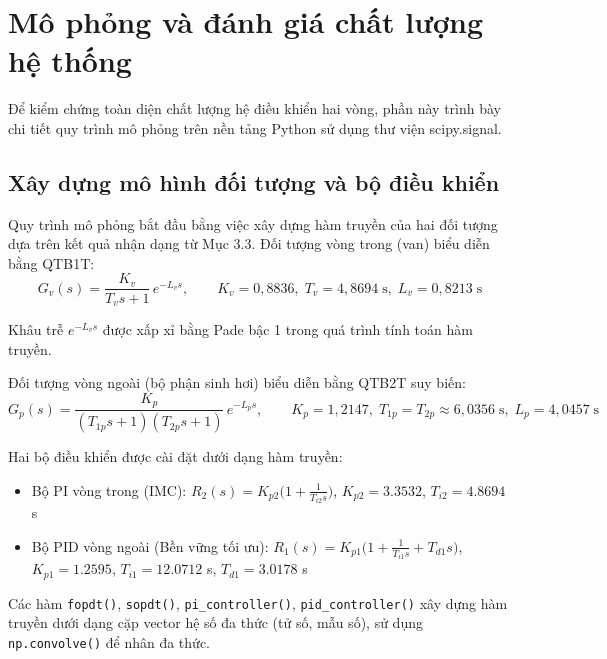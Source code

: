 \documentclass[../main.tex]{subfiles}
\begin{document}
\section{Mô phỏng và đánh giá chất lượng hệ thống}

Để kiểm chứng toàn diện chất lượng hệ điều khiển hai vòng, phần này trình bày chi tiết quy trình mô phỏng trên nền tảng Python sử dụng thư viện scipy.signal.

\subsection{Xây dựng mô hình đối tượng và bộ điều khiển}

Quy trình mô phỏng bắt đầu bằng việc xây dựng hàm truyền của hai đối tượng dựa trên kết quả nhận dạng từ Mục 3.3. Đối tượng vòng trong (van) biểu diễn bằng QTB1T:
\begin{equation}
    G_v(s) = \frac{K_v}{T_v s + 1}\, e^{-L_v s},
    \qquad K_v = 0{,}8836,\; T_v = 4{,}8694\;\text{s},\; L_v = 0{,}8213\;\text{s}
    \label{eq:valve_transfer}
\end{equation}

Khâu trễ $e^{-L_v s}$ được xấp xỉ bằng Pade bậc 1 trong quá trình tính toán hàm truyền.

Đối tượng vòng ngoài (bộ phận sinh hơi) biểu diễn bằng QTB2T suy biến:
\begin{equation}
    G_p(s) = \frac{K_p}{(T_{1p} s + 1)(T_{2p} s + 1)}\, e^{-L_p s},
    \qquad K_p = 1{,}2147,\; T_{1p} = T_{2p} \approx 6{,}0356\;\text{s},\; L_p = 4{,}0457\;\text{s}
    \label{eq:boiler_transfer}
\end{equation}

Hai bộ điều khiển được cài đặt dưới dạng hàm truyền:

\begin{itemize}
    \item Bộ PI vòng trong (IMC): $R_2(s) = K_{p2}\bigl(1 + \frac{1}{T_{i2}s}\bigr)$, $K_{p2} = 3.3532$, $T_{i2} = 4.8694$ s
    \item Bộ PID vòng ngoài (Bền vững tối ưu): $R_1(s) = K_{p1}\bigl(1 + \frac{1}{T_{i1}s} + T_{d1}s\bigr)$, $K_{p1} = 1.2595$, $T_{i1} = 12.0712$ s, $T_{d1} = 3.0178$ s
\end{itemize}

Các hàm {\footnotesize\texttt{fopdt()}}, {\footnotesize\texttt{sopdt()}}, {\footnotesize\texttt{pi\_controller()}}, {\footnotesize\texttt{pid\_controller()}} xây dựng hàm truyền dưới dạng cặp vector hệ số đa thức (tử số, mẫu số), sử dụng {\footnotesize\texttt{np.convolve()}} để nhân đa thức.
\end{document}
